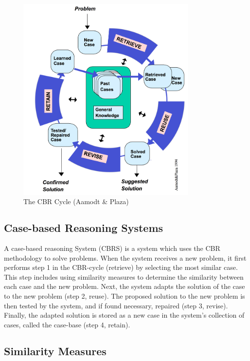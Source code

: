 \begin{figure}[h]
    \centering
    \includegraphics[width=0.8\textwidth]{fig/cbr-cycle.png}
    \caption[The CBR Cycle]{The CBR Cycle (Aamodt \& Plaza) \cite{aamodt1994case}}
    \label{fig:cbr_cycle}
\end{figure}

\subsection{Case-based Reasoning Systems}

A case-based reasoning System (CBRS) is a system which uses the CBR methodology to solve problems. When the system receives a new problem, it first performs step 1 in the CBR-cycle (retrieve) by selecting the most similar case. This step includes using similarity measures to determine the similarity between each case and the new problem. Next, the system adapts the solution of the case to the new problem (step 2, reuse). The proposed solution to the new problem is then tested by the system, and if found necessary, repaired (step 3, revise). Finally, the adapted solution is stored as a new case in the system's collection of cases, called the case-base (step 4, retain).

\subsection{Similarity Measures}

